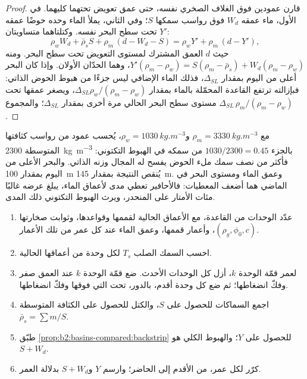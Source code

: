 \begin{proof}
قارن عمودين فوق الغلاف الصخري نفسه، حتى عمق تعويض تحتهما كليهما. في
الأول، ماء عمقه $W_d$ فوق رواسب سمكها $S$؛ وفي الثاني، يملأ الماء
وحده حوضًا عمقه $Y'$ تحت سطح البحر نفسه. وكتلتاهما متساويتان:
\[
  \rho_w W_d + \bar\rho_s S + \rho_m\,(d - W_d - S) = \rho_w Y' + \rho_m\,(d - Y'),
\]
حيث $d$ العمق المشترك لمستوى التعويض تحت سطح البحر. ومنه
$Y'(\rho_m - \rho_w) = S(\rho_m - \bar\rho_s) + W_d(\rho_m - \rho_w)$، وهما الحدّان
الأولان. وإذا كان البحر أعلى من اليوم بمقدار $\Delta_{SL}$، فذلك الماء الإضافي ليس جزءًا من
هبوط الحوض الذاتي: فبإزالته ترتفع القاعدة المحمّلة بالماء بمقدار
$\Delta_{SL}\rho_w/(\rho_m - \rho_w)$، ويصغر عمقها تحت مستوى سطح البحر الحالي مرة أخرى بمقدار
$\Delta_{SL}$؛ والمجموع $\Delta_{SL}\,\rho_m/(\rho_m - \rho_w)$.
\end{proof}

مع $\rho_m = \qty{3330}{kg.m^{-3}}$ و$\rho_w = \qty{1030}{kg.m^{-3}}$، يُحسب عمود من رواسب
كثافتها المتوسطة \qty{2300}{kg.m^{-3}} بالجزء $1030/2300 = 0.45$ من سمكه في الهبوط
التكتوني: فأكثر من نصف سمك ملء الحوض يفسح له المجال وزنه الذاتي.
والبحر الأعلى من اليوم بمقدار \qty{100}{m} يُنقص النتيجة بمقدار \qty{145}{m}. وعمق الماء
ومستوى البحر في الماضي هما أضعف المعطيات: فالأحافير تعطي مدى لأعماق الماء، يبلغ عرضه
غالبًا مئات الأمتار على المنحدر، ويرث الهبوط التكتوني ذلك المدى.

\begin{method}\label{met:b2:basins-compared:backstrip}
\begin{enumerate}
  \item عدّد الوحدات من القاعدة، مع الأعماق الحالية لقممها وقواعدها، وثوابت
        صخارتها $(\rho_g, \phi_0, c)$، وأعمار قممها، وعمق الماء عند
        كل عمر من تلك الأعمار.
  \item احسب السمك الصلب $T_s$ لكل وحدة من أعماقها الحالية.
  \item لعمر قمّة الوحدة $k$، أزل كل الوحدات الأحدث. ضع قمّة الوحدة
        $k$ عند العمق صفر وفكّ انضغاطها؛ ثم ضع كل وحدة أقدم، بالدور، تحت التي فوقها
        وفكّ انضغاطها.
  \item اجمع السماكات للحصول على $S$، والكتل للحصول على الكثافة المتوسطة
        $\bar\rho_s = \sum m / S$.
  \item طبّق \cref{prop:b2:basins-compared:backstrip} للحصول على $Y$؛ والهبوط الكلي هو
        $S + W_d$.
  \item كرّر لكل عمر، من الأقدم إلى الحاضر؛ وارسم $Y$ و$S + W_d$ بدلالة العمر.
\end{enumerate}
\end{method}


